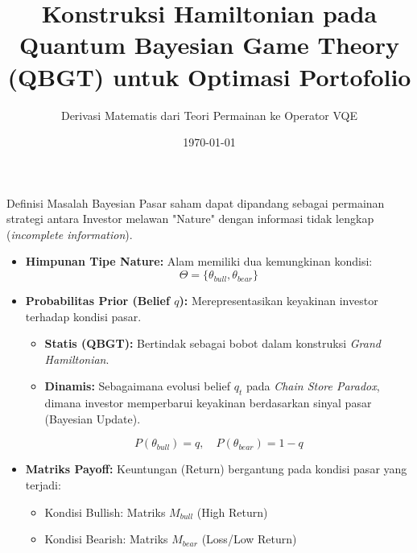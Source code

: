 \documentclass{beamer}
\title[Konstruksi Hamiltonian QBGT]{Konstruksi Hamiltonian pada Quantum Bayesian Game Theory (QBGT) untuk Optimasi Portofolio}
\subtitle{Derivasi Matematis dari Teori Permainan ke Operator VQE}
\date{\today}
\begin{document}
\begin{frame}
    \titlepage
\end{frame}

\begin{frame}{Definisi Masalah Bayesian}
    Pasar saham dapat dipandang sebagai permainan strategi antara Investor melawan "Nature" dengan informasi tidak lengkap (\textit{incomplete information}).
    
    \begin{itemize}
        \item \textbf{Himpunan Tipe Nature:}
        Alam memiliki dua kemungkinan kondisi:
        $$ \Theta = \{\theta_{bull}, \theta_{bear}\} $$
        
        \item \textbf{Probabilitas Prior (Belief $q$):}
        Merepresentasikan keyakinan investor terhadap kondisi pasar.
        \begin{itemize}
            \item \textbf{Statis (QBGT):} Bertindak sebagai bobot dalam konstruksi \textit{Grand Hamiltonian}.
            \item \textbf{Dinamis:} Sebagaimana evolusi belief $q_t$ pada \textit{Chain Store Paradox}, dimana investor memperbarui keyakinan berdasarkan sinyal pasar (Bayesian Update).
        \end{itemize}
        $$ P(\theta_{bull}) = q, \quad P(\theta_{bear}) = 1-q $$
        
        \item \textbf{Matriks Payoff:}
        Keuntungan (Return) bergantung pada kondisi pasar yang terjadi:
        \begin{itemize}
            \item Kondisi Bullish: Matriks $M_{bull}$ (High Return)
            \item Kondisi Bearish: Matriks $M_{bear}$ (Loss/Low Return)
        \end{itemize}
    \end{itemize}
\end{frame}
\end{document}
